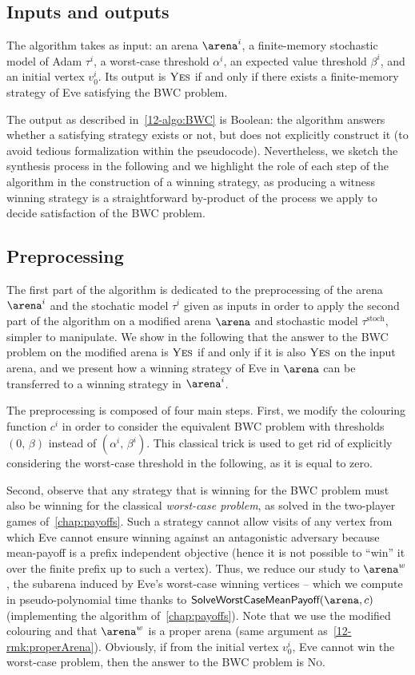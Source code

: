 \subsection*{Inputs and outputs} The algorithm takes as input: an arena $\arena^{i}$, a finite-memory stochastic model of Adam $\tau^{i}$, a worst-case threshold $\alpha^{i}$, an expected value threshold $\beta^{i}$, and an initial vertex $v_0^{i}$. Its output is $\textsc{Yes}$ if and only if there exists a finite-memory strategy of Eve satisfying the BWC problem.

The output as described in~\cref{12-algo:BWC} is Boolean: the algorithm answers whether a satisfying strategy exists or not, but does not explicitly construct it (to avoid tedious formalization within the pseudocode). Nevertheless, we sketch the synthesis process in the following and we highlight the role of each step of the algorithm in the construction of a winning strategy, as producing a witness winning strategy is a straightforward by-product of the process we apply to decide satisfaction of the BWC problem.


\subsection*{Preprocessing} The first part of the algorithm is dedicated to the preprocessing of the arena $\arena^{i}$ and the stochatic model $\tau^{i}$ given as inputs in order to apply the second part of the algorithm on a modified arena $\arena$ and stochastic model $\tau^{\text{stoch}}$, simpler to manipulate. We show in the following that the answer to the BWC problem on the modified arena is $\textsc{Yes}$ if and only if it is also $\textsc{Yes}$ on the input arena, and we present how a winning strategy of Eve in $\arena$ can be transferred to a winning strategy in $\arena^{i}$.

The preprocessing is composed of four main steps. First, we modify the colouring function $c^i$ in order to consider the equivalent BWC problem with thresholds $(0,\, \beta)$ instead of $(\alpha^{i},\, \beta^{i})$. This classical trick is used to get rid of explicitly considering the worst-case threshold in the following, as it is equal to zero.

Second, observe that any strategy that is winning for the BWC problem must also be winning for the classical \textit{worst-case problem}, as solved in the two-player games of~\cref{chap:payoffs}. Such a strategy cannot allow visits of any vertex from which Eve cannot ensure winning against an antagonistic adversary because mean-payoff is a prefix independent objective (hence it is not possible to ``win'' it over the finite prefix up to such a vertex). Thus, we reduce our study to $\arena^{w}$, the subarena induced by Eve's worst-case winning vertices -- which we compute in pseudo-poly\-nomial time thanks to $\textsf{SolveWorstCaseMeanPayoff}(\arena, c)$ (implementing the algorithm of~\cref{chap:payoffs}).   Note that we use the modified colouring and that $\arena^{w}$ is a proper arena (same argument as~\cref{12-rmk:properArena}). Obviously, if from the initial vertex $v_0^{i}$, Eve cannot win the worst-case problem, then the answer to the BWC problem is \textsc{No}.

